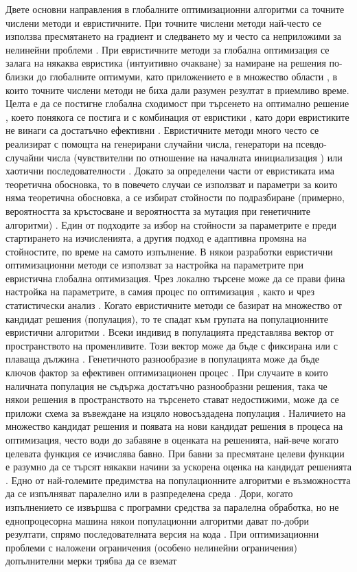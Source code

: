 Двете основни направления в глобалните оптимизационни алгоритми са точните числени методи и евристичните. При точните числени методи най-често се използва пресмятането на градиент и следването му и често са неприложими за нелинейни проблеми \cite{Koziel-01}. При евристичните методи за глобална оптимизация се залага на някаква евристика (интуитивно очакване) за намиране на решения по-близки до глобалните оптимуми, като приложението е в множество области \cite{Slowik-02}, в които точните числени методи не биха дали разумен резултат в приемливо време. Целта е да се постигне глобална сходимост при търсенето на оптимално решение \cite{Beyer-01}, което понякога се постига и с комбинация от евристики \cite{Grosan-01}, като дори евристиките не винаги са достатъчно ефективни \cite{He-01}. Евристичните методи много често се реализират с помощта на генерирани случайни числа, генератори на псевдо-случайни числа (чувствителни по отношение на началната инициализация \cite{Eiben-02}) или хаотични последователности \cite{Caponetto-01}. Докато за определени части от евристиката има теоретична обосновка, то в повечето случаи се използват и параметри за които няма теоретична обосновка, а се избират стойности по подразбиране (примерно, вероятността за кръстосване и вероятността за мутация при генетичните алгоритми) \cite{Eiben-01}. Един от подходите за избор на стойности за параметрите е преди стартирането на изчисленията, а другия подход е адаптивна промяна на стойностите, по време на самото изпълнение. В някои разработки евристични оптимизационни методи се използват за настройка на параметрите при евристична глобална оптимизация. Чрез локално търсене може да се прави фина настройка на параметрите, в самия процес по оптимизация \cite{Karafotias-01}, както и чрез статистически анализ \cite{Francois-01}. Когато евристичните методи се базират на множество от кандидат решения (популация), то те спадат към групата на популационните евристични алгоритми \cite{Whitley-01}. Всеки индивид в популацията представлява вектор от пространството на променливите. Този вектор може да бъде с фиксирана или с плаваща дължина \cite{Ryerkerk-01}. Генетичното разнообразие в популацията може да бъде ключов фактор за ефективен оптимизационен процес \cite{Ursem-01}. При случаите в които наличната популация не съдържа достатъчно разнообразни решения, така че някои решения в пространството на търсенето стават недостижими, може да се приложи схема за въвеждане на изцяло новосъздадена популация \cite{Wegener-01}. Наличието на множество кандидат решения и появата на нови кандидат решения в процеса на оптимизация, често води до забавяне в оценката на решенията, най-вече когато целевата функция се изчислява бавно. При бавни за пресмятане целеви функции е разумно да се търсят някакви начини за ускорена оценка на кандидат решенията \cite{Salami-01}. Едно от най-големите предимства на популационните алгоритми е възможността да се изпълняват паралелно или в разпределена среда \cite{Vikhar-01}. Дори, когато изпълнението се извършва с програмни средства за паралелна обработка, но не еднопроцесорна машина някои популационни алгоритми дават по-добри резултати, спрямо последователната версия на кода \cite{Alba-01}. При оптимизационни проблеми с наложени ограничения (особено нелинейни ограничения) допълнителни мерки трябва да се вземат 